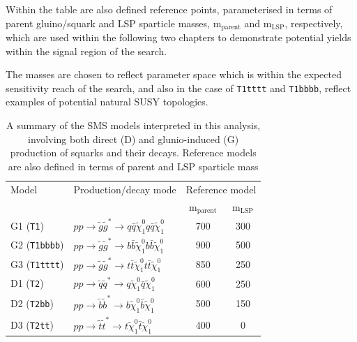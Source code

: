Within the table are also defined reference points, parameterised in terms of parent gluino/squark and \ac{LSP} sparticle masses, m$_{\text{parent}}$ and m$_{\text{LSP}}$, respectively, which are used within the following two chapters to demonstrate potential yields within the signal region of the search. 

The masses are chosen to reflect parameter space which is within the expected sensitivity reach of the search, and also in the case of \texttt{T1tttt} and \texttt{T1bbbb}, reflect examples of potential natural \ac{SUSY} topologies.

\begin{table}[h!]
\footnotesize
\begin{center}
\begin{tabular*}{0.75\textwidth}{@{\extracolsep{\fill}}llcc}
\hline
Model & Production/decay mode &  \multicolumn{2}{c}{Reference model}\\ 
&& m$_{\text{parent}}$ & m$_{\text{LSP}}$ \\  \hline\hline
G1 (\texttt{T1}) & $ pp \rightarrow \widetilde{g}\widetilde{g}^{*} \rightarrow q\bar{q}\widetilde{\chi}^{0}_{1}q\bar{q}\widetilde{\chi}^{0}_{1}$ & 700 & 300 \\
G2 (\texttt{T1bbbb}) & $ pp \rightarrow \widetilde{g}\widetilde{g}^{*} \rightarrow b\bar{b}\widetilde{\chi}^{0}_{1}b\bar{b}\widetilde{\chi}^{0}_{1}$ & 900 & 500 \\
G3 (\texttt{T1tttt}) & $ pp \rightarrow \widetilde{g}\widetilde{g}^{*} \rightarrow t\bar{t}\widetilde{\chi}^{0}_{1}t\bar{t}\widetilde{\chi}^{0}_{1}$ & 850 & 250 \\
D1 (\texttt{T2}) & $ pp \rightarrow \widetilde{q}\widetilde{q}^{*} \rightarrow q\widetilde{\chi}^{0}_{1}\bar{q}\widetilde{\chi}^{0}_{1}$ & 600 & 250 \\
D2 (\texttt{T2bb}) & $ pp \rightarrow \widetilde{b}\widetilde{b}^{*} \rightarrow b\widetilde{\chi}^{0}_{1}\bar{b}\widetilde{\chi}^{0}_{1}$ & 500 & 150 \\
D3 (\texttt{T2tt}) & $ pp \rightarrow \widetilde{t}\widetilde{t}^{*} \rightarrow t\widetilde{\chi}^{0}_{1}\bar{t}\widetilde{\chi}^{0}_{1}$ & 400 & 0 \\
\cline{1-4}
\end{tabular*}
\end{center}
\caption[A summary of the \ac{SMS} models interpreted in this analysis, involving both direct (D) and glunio-induced (G) production of squarks and their decays.]{A summary of the \ac{SMS} models interpreted in this analysis, involving both direct (D) and glunio-induced (G) production of squarks and their decays. Reference models are also defined in terms of parent and \ac{LSP} sparticle mass }
\label{tab:sms_model_table}
\end{table}

